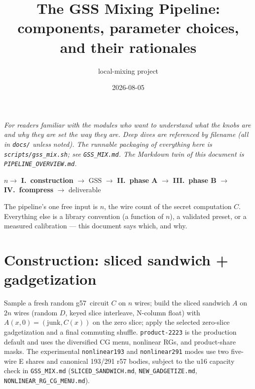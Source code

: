 \documentclass[11pt]{article}
\title{The GSS Mixing Pipeline:\\ \large components, parameter choices, and their rationales}
\author{local-mixing project}
\date{2026-08-05}
\newcommand{\g}{\textsf{g57}}
\newcommand{\doc}[1]{\texttt{#1}}
\begin{document}
\maketitle

\noindent\emph{For readers familiar with the modules who want to understand
what the knobs are and why they are set the way they are. Deep dives are
referenced by filename (all in \doc{docs/} unless noted). The runnable
packaging of everything here is \doc{scripts/gss\_mix.sh}; see
\doc{GSS\_MIX.md}. The Markdown twin of this document is
\doc{PIPELINE\_OVERVIEW.md}.}

\begin{center}
$n \rightarrow$ \textbf{I.~construction} $\rightarrow$ GSS
$\rightarrow$ \textbf{II.~phase A} $\rightarrow$ \textbf{III.~phase B}
$\rightarrow$ \textbf{IV.~fcompress} $\rightarrow$ deliverable
\end{center}

The pipeline's one free input is $n$, the wire count of the secret
computation $C$. Everything else is a library convention (a function of
$n$), a validated preset, or a measured calibration --- this document says
which, and why.

\section{Construction: sliced sandwich + gadgetization}

Sample a fresh random \g\ circuit $C$ on $n$ wires; build the sliced
sandwich $A$ on $2n$ wires (random $D$, keyed slice interleave, N-column
float) with $A(x,0)=(\mathrm{junk}, C(x))$ on the zero slice; apply the
selected zero-slice gadgetization and a final commuting shuffle.
\texttt{product-2223} is the production default and uses the diversified CG
menu, nonlinear RGs, and product-share masks. The experimental
\texttt{nonlinear193} and \texttt{nonlinear291} modes use two five-wire E
shares and canonical 193/291 r57 bodies, subject to the u16 capacity check in
\doc{GSS\_MIX.md} (\doc{SLICED\_SANDWICH.md},
\doc{NEW\_GADGETIZE.md}, \doc{NONLINEAR\_RG\_CG\_MENU.md}).
\end{document}
